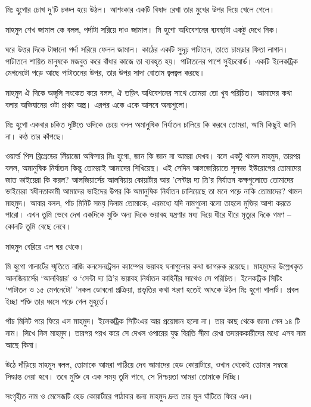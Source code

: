 \documentclass[
]{book}
\begin{document}
মিঃ হুগোর চোখ দু'টি চঞ্চল হয়ে উঠল। আশংকার একটি বিষাদ রেখা তার মুখের উপর দিয়ে খেলে গেলে।

মাহমুদ শেখ জামাল কে বলল, পর্দাটা সরিয়ে দাও জামাল। মি হুগো অধিবেশনের ব্যবস্থাটা একটু দেখে নিক।

ঘরে উত্তর দিকে টাঙ্গানো পর্দা সরিয়ে ফেলল জামাল। কাঠের একটি সুদৃঢ় পাটাতন, তাতে চামড়ার ফিতা লাগান। পাটাতনে শায়িত মানুষকে মজবুত করে বাঁধার কাজে তা ব্যবহৃত হয়। পাটাতনের পাশে সুইচবোর্ড। একটি ইলেকট্রিক মেগনেটো পড়ে আছে পাটাতনের উপর, তার উপর সাদা বোতাম জ্বলজ্বল করছে।

মাহমুদ ঐ দিকে অঙ্গুলি সংকেত করে বলল, ঐ তড়িৎ অধিবেশনের সাথে তোমরা তো খুব পরিচিত। আমাদের কথা বলার অভিযানের ওটা প্রথম অস্ত্র। এরপর একে একে আসবে অন্যগুলো।

মিঃ হুগো একবার চকিত দৃষ্টিতে ওদিকে চেয়ে বলল অমানুষিক নির্যাতন চালিয়ে কি করবে তোমরা, আমি কিছুই জানি না। কণ্ঠ তার কাঁপছে।

ওয়ার্ল্ড পিস ব্রিগ্রেডের লিঁয়াজো অফিসার মিঃ হুগো, জান কি জান না আমরা দেখব। বলে একটু থামল মাহমুদ, তারপর বলল, অমানুষিক নির্যাতন কিন্তু তোমরাই আমাদের শিখিয়েছ। এই সেদিন আলজেরিয়াতে সুসভ্য ইউরোপের তোমাদের জাত ভাইয়েরা কি করল? আলজিয়ার্সের আলবিয়ায় কোয়ার্টার আর 'সেন্টার দ্য ত্রি'র নির্যাতন কক্ষগুলোতে তোমাদের ভাইয়েরা স্বধীনতাকামী আমাদের ভাইদের উপর কি অমানুষিক নির্যাতন চালিয়েছে তা মনে পড়ে নাকি তোমাদের? থামল মাহমুদ। আবার বলল, পাঁচ মিনিট সময় দিলাম তোমাকে, এরমধ্যে যদি নামগুলো বলো তাহলে মুক্তির আশা করতে পারো। এখন তুমি ভেবে দেখ একদিকে মুক্তি অন্য দিকে ভয়াবহ যন্ত্রণার মধ্য দিয়ে ধীরে ধীরে মৃত্যুর দিকে গমণ -- কোনটি তুমি বেছে নেবে।

মাহমুদ বেরিয়ে এল ঘর থেকে।

মি হুগো গালার্টের স্মৃতিতে নাজি কনসেনট্রেসন ক্যাম্পের ভয়াবহ ঘনাগুলোর কথা জাগরুক রয়েছে। মাহমুদের উল্লেখকৃত আলজিয়ার্সের `আলবিয়ার' ও `সেন্টা দ্য ত্রি'র ভয়াবহ নির্যাতন কাহিনীর সাথেও সে পরিচিত। ইলেকট্রিক সিটিং `পাটাতন ও ১৫ মেগনেটো' 'নকল ডোবনো প্রক্রিয়া, প্রভৃতির কথা স্মরণ হতেই আৎকে উঠল মিঃ হুগো গালার্ট। প্রবল ইচ্ছা শক্তি তার ধ্বসে পড়ে গেল মুহূর্তে।

পাঁচ মিনিট পরে ফিরে এল মাহমুদ। ইলেকট্রিক সিটিংএর আর প্রয়োজন হলো না। তার কাছ থেকে জানা গেল ১৪ টি নাম। লিখে নিল মাহমুদ। তারপর পরখ করে সে দেখল ওপারের যুদ্ধ বিরতি সীমা রেখা তদারককারীদের মধ্যে এসব নাম আছে কিনা।

উঠে দাঁড়িয়ে মাহমুদ বলল, তোমাকে আমরা পাঠিয়ে দেব আমাদের হেড কোয়ার্টারে, ওখান থেকেই তোমার সম্বন্ধে সিদ্ধান্ত নেয়া হবে। তবে মুক্তি যে এক সময় তুমি পাবে, সে নিশ্চয়তা আমরা তোমাকে দিচ্ছি।

সংগৃহীত নাম ও মেসেজটি হেড কোয়ার্টারে পাঠাবার জন্য মাহমুদ দ্রুত তার মূল ঘাঁটিতে ফিরে এল।
\end{document}
